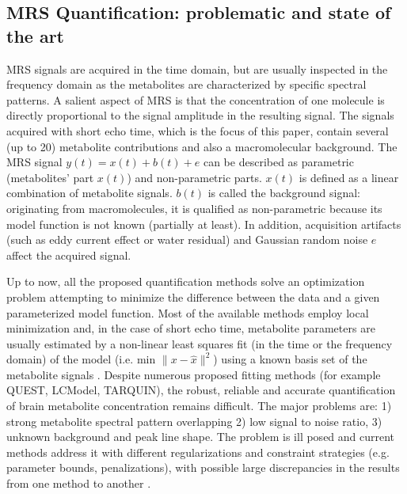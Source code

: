 \documentclass{llncs}
\begin{document}
\subsection{MRS Quantification: problematic and state of the art}


MRS signals are acquired in the time domain, but are usually inspected in the frequency domain as the metabolites are characterized by specific spectral patterns. A salient aspect of MRS is that the concentration of one molecule is directly proportional to the signal amplitude in the resulting signal. The signals acquired with short echo time, which is the focus of this paper, contain several (up to 20) metabolite contributions and also a macromolecular background. The MRS signal $y(t)= x(t) + b(t) + e$ can be described as parametric (metabolites' part $x(t)$) and non-parametric parts. $x(t)$ is defined as a linear combination of metabolite signals. $b(t)$  is called the background signal: originating from macromolecules, it is qualified as non-parametric because its model function is not known (partially at least). In addition, acquisition artifacts (such as eddy current effect or water residual) and Gaussian random noise $e$ affect the acquired signal.  

Up to now, all the proposed quantification methods solve an optimization problem attempting  to minimize the difference between the data and a given parameterized model function. Most of the available methods employ local minimization and, in the case of short echo time, metabolite parameters are usually estimated by a non-linear least squares fit (in the time or the frequency domain) of the model (i.e. min $\lVert x -\hat{x} \rVert ^{2}$) using a known basis set of the metabolite signals . Despite numerous proposed fitting methods (for example QUEST\cite{quest}, LCModel\cite{Provencher1993lcmodel}, TARQUIN\cite{Wilson2011tarquin}), the robust, reliable and accurate quantification of brain metabolite concentration remains difficult. The major problems are: 
1) strong metabolite spectral pattern overlapping %
2) low signal to noise ratio, 
3) unknown background and peak line shape.
The problem is ill posed and current methods address it with different regularizations and constraint strategies 
(e.g. parameter bounds, penalizations), with possible large discrepancies in the results from one method to another \cite{Bhogal_2017}. 
\end{document}
